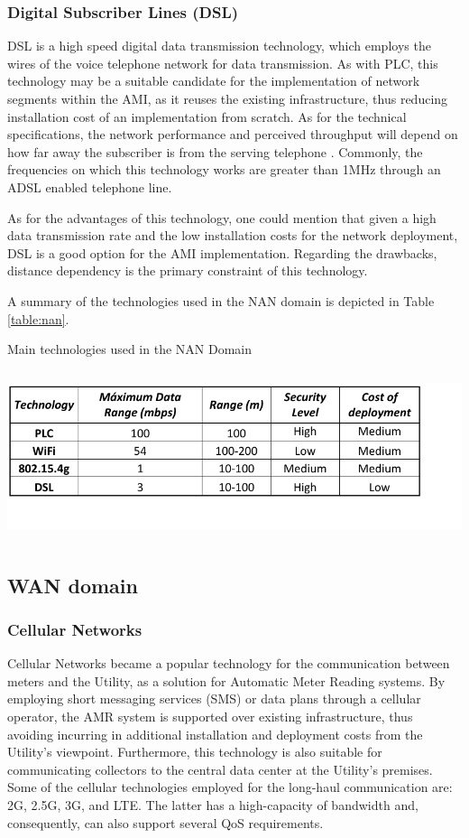 \documentclass[11pt,draftclsnofoot,onecolumn]{IEEEtran}
\begin{document}
\subsubsection{Digital Subscriber Lines (DSL)}\label{dsl}
DSL is a high speed digital data transmission technology, which employs the wires of the voice telephone network for data transmission. As with PLC, this technology may be a suitable candidate for the implementation of network segments within the AMI, as it reuses the existing infrastructure, thus reducing installation cost of an implementation from scratch. As for the technical specifications, the network performance and perceived throughput will depend on how far away the subscriber is from the serving telephone  \cite{Gungor2011}. Commonly, the frequencies on which this technology works are greater than 1MHz through an ADSL enabled telephone line. 

As for the advantages of this technology, one could mention that given a high data transmission rate and the low installation costs for the network deployment, DSL is a good option for the AMI implementation. Regarding the drawbacks, distance dependency is the primary constraint of this technology.

A summary of the technologies used in the NAN domain is depicted in Table \ref{table:nan}.

\begin{table}[hp!]
\caption{Main technologies used in the NAN Domain}
\label{table:nan}
\centering
\includegraphics [height=5cm] {NAN-TECH}
\end{table}

\subsection{WAN domain}

\subsubsection{Cellular Networks}\label{tech::cellular}
Cellular Networks became a popular technology for the communication between meters and the Utility, as a solution for Automatic Meter Reading systems. By employing short messaging services (SMS) or data plans through a cellular operator, the AMR system is supported over existing infrastructure, thus avoiding incurring in additional installation and deployment costs from the Utility's viewpoint. Furthermore, this technology is also suitable for communicating collectors to the central data center at the Utility's premises. Some of the cellular technologies employed for the long-haul communication are: 2G, 2.5G, 3G, and LTE. The latter has a high-capacity of bandwidth and, consequently, can also support several QoS requirements.
\end{document}
